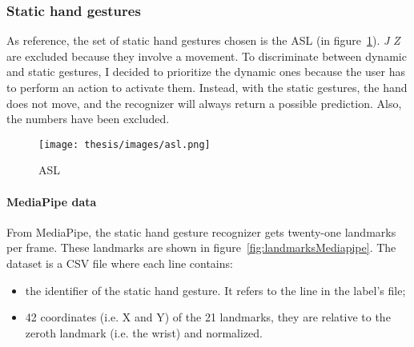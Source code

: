 \documentclass[../thesis.tex]{subfiles}
\begin{document}
\subsubsection{Static hand gestures}
As reference, the set of static hand gestures chosen is the \gls{ASL} (in figure~\ref{fig:asl}). \textit{J} \textit{Z} are excluded because they involve a movement. To discriminate between dynamic and static gestures, I decided to prioritize the dynamic ones because the user has to perform an action to activate them. Instead, with the static gestures, the hand does not move, and the recognizer will always return a possible prediction. Also, the numbers have been excluded. 

\begin{figure}
    \centering
    \texttt{[image: thesis/images/asl.png]}
    \caption{\glsdesc{ASL}~\parencite{img:asl}}\label{fig:asl}
\end{figure}

\paragraph{MediaPipe data}
From MediaPipe, the static hand gesture recognizer gets twenty-one landmarks per frame. These landmarks are shown in figure~\ref{fig:landmarksMediapipe}. The dataset is a CSV file where each line contains:
\begin{itemize}
    \item the identifier of the static hand gesture. It refers to the line in the label’s file; 
    \item 42 coordinates (i.e. X and Y) of the 21 landmarks, they are relative to the zeroth landmark (i.e. the wrist) and normalized. 
\end{itemize}
\end{document}
